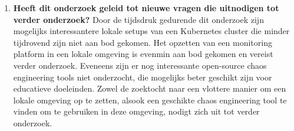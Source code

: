 \begin{enumerate}
\begin{itemize}
\end{itemize} 
\newline 
\item {\bf Heeft dit onderzoek geleid tot nieuwe vragen die uitnodigen tot verder onderzoek?}
\newline Door de tijdsdruk gedurende dit onderzoek zijn mogelijks interessantere lokale setups van een Kubernetes cluster die minder tijdrovend zijn niet aan bod gekomen. Het opzetten van een monitoring platform in een lokale omgeving is evenmin aan bod gekomen en vereist verder onderzoek. Eveneens zijn er nog interessante open-source chaos engineering tools niet onderzocht, die mogelijks beter geschikt zijn voor educatieve doeleinden. \newline Zowel de zoektocht naar een vlottere manier om een lokale omgeving op te zetten, alsook een geschikte chaos engineering tool te vinden om te gebruiken in deze omgeving, nodigt zich uit tot verder onderzoek.   
\end{enumerate}